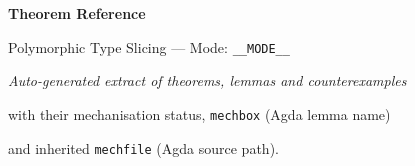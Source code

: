 \documentclass[12pt]{article}
\begin{document}
\begin{titlepage}
  \centering
  \vspace*{4cm}
  {\Huge\bfseries Theorem Reference\par}\vspace{1cm}
  {\large Polymorphic Type Slicing --- Mode: \texttt{__MODE__}\par}
  \vspace{2cm}
  {\itshape Auto-generated extract of theorems, lemmas and counterexamples\par
   with their mechanisation status, \texttt{mechbox} (Agda lemma name)\par
   and inherited \texttt{mechfile} (Agda source path).\par}
\end{titlepage}
\tableofcontents
\clearpage
\end{document}
